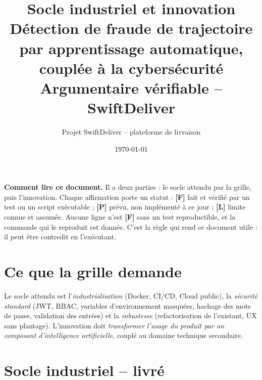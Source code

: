 \documentclass[11pt,a4paper]{article}
\title{\textbf{Socle industriel et innovation\\[0.3em]
\large D\'etection de fraude de trajectoire par apprentissage automatique,\\ coupl\'ee \`a la cybers\'ecurit\'e\\[0.4em]
\normalsize Argumentaire v\'erifiable -- SwiftDeliver}}
\author{Projet SwiftDeliver -- plateforme de livraison}
\date{\today}
\begin{document}
\maketitle

\noindent
\textbf{Comment lire ce document.} Il a deux parties : le socle attendu par la grille, puis l'innovation. Chaque affirmation porte un statut : \textbf{[F]} fait et v\'erifi\'e par un test ou un script ex\'ecutable ; \textbf{[P]} pr\'evu, non impl\'ement\'e \`a ce jour ; \textbf{[L]} limite connue et assum\'ee. Aucune ligne n'est \textbf{[F]} sans un test reproductible, et la commande qui le reproduit est donn\'ee. C'est la r\`egle qui rend ce document utile : il peut \^etre contredit en l'ex\'ecutant.

\section{Ce que la grille demande}
Le socle attendu est l'\emph{industrialisation} (Docker, CI/CD, Cloud public), la \emph{s\'ecurit\'e standard} (JWT, RBAC, variables d'environnement masqu\'ees, hachage des mots de passe, validation des entr\'ees) et la \emph{robustesse} (refactorisation de l'existant, UX sans plantage). L'innovation doit \emph{transformer l'usage du produit par un composant d'intelligence artificielle}, coupl\'e au domaine technique secondaire.

\section{Socle industriel -- livr\'e}
\end{document}
